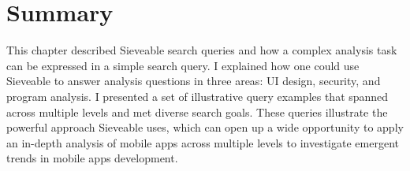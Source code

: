\section{Summary}
This chapter described Sieveable search queries and how a complex analysis task can be expressed in a simple search query.
I explained how one could use Sieveable to answer analysis questions in three areas: UI design, security, and program analysis.
I presented a set of illustrative query examples that spanned across multiple levels and met diverse search goals.
These queries illustrate the powerful approach Sieveable uses, which can open up a wide opportunity to apply an in-depth analysis of mobile apps across multiple levels to investigate emergent trends in mobile apps development.